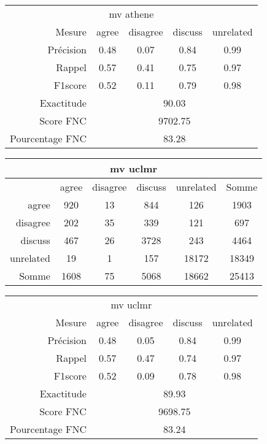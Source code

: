 \documentclass[onecolumn, 12pt]{article}
\begin{document}
\begin{center}
 \begin{tabular}{ r | c c c c }
  \multicolumn{5}{c}{mv athene}\\
  Mesure     & agree & disagree & discuss & unrelated \\
  \hline
  Précision & 0.48  & 0.07     & 0.84    & 0.99      \\
  Rappel     & 0.57  & 0.41     & 0.75    & 0.97      \\
  F1score    & 0.52  & 0.11     & 0.79    & 0.98      \\
  \hline
  \hline
  Exactitude & \multicolumn{4}{c}{90.03}\\
  Score FNC & \multicolumn{4}{c}{9702.75}\\
  Pourcentage FNC & \multicolumn{4}{c}{83.28}\\
 \end{tabular}
\end{center}



\begin{center}
 \begin{tabular}{ r | c c c c | c }
  \multicolumn{6}{c}{mv uclmr}\\
  \hline
            & agree & disagree & discuss & unrelated & Somme \\
  \hline
  agree     & 920   & 13       & 844     & 126       & 1903  \\
  disagree  & 202   & 35       & 339     & 121       & 697   \\
  discuss   & 467   & 26       & 3728    & 243       & 4464  \\
  unrelated & 19    & 1        & 157     & 18172     & 18349 \\
  \hline
  Somme     & 1608  & 75       & 5068    & 18662     & 25413 \\
 \end{tabular}
\end{center}


\begin{center}
 \begin{tabular}{ r | c c c c }
  \multicolumn{5}{c}{mv uclmr}\\
  Mesure     & agree & disagree & discuss & unrelated \\
  \hline
  Précision & 0.48  & 0.05     & 0.84    & 0.99      \\
  Rappel     & 0.57  & 0.47     & 0.74    & 0.97      \\
  F1score    & 0.52  & 0.09     & 0.78    & 0.98      \\
  \hline
  \hline
  Exactitude & \multicolumn{4}{c}{89.93}\\
  Score FNC & \multicolumn{4}{c}{9698.75}\\
  Pourcentage FNC & \multicolumn{4}{c}{83.24}\\
 \end{tabular}
\end{center}
\end{document}
